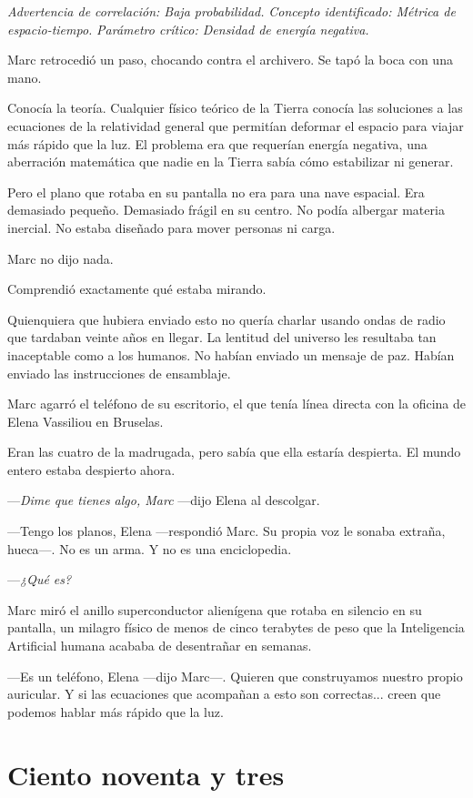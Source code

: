 \documentclass[11pt,a5paper,twoside]{book}
\begin{document}
\textit{Advertencia de correlación: Baja probabilidad.}
\textit{Concepto identificado: Métrica de espacio-tiempo.}
\textit{Parámetro crítico: Densidad de energía negativa.}

Marc retrocedió un paso, chocando contra el archivero. Se tapó la boca con una mano.

Conocía la teoría. Cualquier físico teórico de la Tierra conocía las soluciones a las ecuaciones de la relatividad general que permitían deformar el espacio para viajar más rápido que la luz. El problema era que requerían energía negativa, una aberración matemática que nadie en la Tierra sabía cómo estabilizar ni generar.

Pero el plano que rotaba en su pantalla no era para una nave espacial. Era demasiado pequeño. Demasiado frágil en su centro. No podía albergar materia inercial. No estaba diseñado para mover personas ni carga.

Marc no dijo nada.

Comprendió exactamente qué estaba mirando.

Quienquiera que hubiera enviado esto no quería charlar usando ondas de radio que tardaban veinte años en llegar. La lentitud del universo les resultaba tan inaceptable como a los humanos. No habían enviado un mensaje de paz. Habían enviado las instrucciones de ensamblaje.

Marc agarró el teléfono de su escritorio, el que tenía línea directa con la oficina de Elena Vassiliou en Bruselas.

Eran las cuatro de la madrugada, pero sabía que ella estaría despierta. El mundo entero estaba despierto ahora.

—\textit{Dime que tienes algo, Marc} —dijo Elena al descolgar.

—Tengo los planos, Elena —respondió Marc. Su propia voz le sonaba extraña, hueca—. No es un arma. Y no es una enciclopedia.

—\textit{¿Qué es?}

Marc miró el anillo superconductor alienígena que rotaba en silencio en su pantalla, un milagro físico de menos de cinco terabytes de peso que la Inteligencia Artificial humana acababa de desentrañar en semanas.

—Es un teléfono, Elena —dijo Marc—. Quieren que construyamos nuestro propio auricular. Y si las ecuaciones que acompañan a esto son correctas... creen que podemos hablar más rápido que la luz.

\chapter{Ciento noventa y tres}
\end{document}
